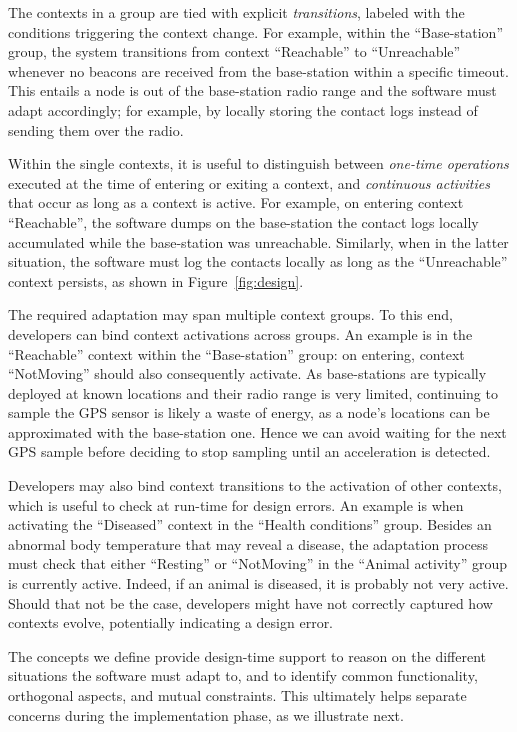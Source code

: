 The contexts in a group are tied with explicit \emph{transitions},
labeled with the conditions triggering the context change. For
example, within the ``Base-station'' group, the system transitions
from context ``Reachable'' to ``Unreachable'' whenever no beacons are
received from the base-station within a specific timeout. This entails
a node is out of the base-station radio range and the software must
adapt accordingly; for example, by locally storing the contact logs
instead of sending them over the radio.

Within the single contexts, it is useful to distinguish between
\emph{one-time operations} executed at the time of entering or exiting
a context, and \emph{continuous activities} that occur as long as a
context is active. For example, on entering context ``Reachable'', the
software dumps on the base-station the contact logs locally
accumulated while the base-station was unreachable. Similarly, when in
the latter situation, the software must log the contacts locally as
long as the ``Unreachable'' context persists, as shown in
Figure~\ref{fig:design}.

The required adaptation may span multiple context
groups. To this end, developers can bind context activations across
groups. An example is in the ``Reachable'' context within the
``Base-station'' group: on entering, context ``NotMoving'' should
also consequently activate. As base-stations are typically deployed at
known locations and their radio range is very limited, continuing
to sample the GPS sensor is likely a waste of energy, as a node's
locations can be approximated with the base-station one. Hence we can
avoid waiting for the next GPS sample before deciding to stop
sampling until an acceleration is detected.

Developers may also bind context transitions to the activation of
other contexts, which is useful to check at run-time for design
errors. An example is when activating the ``Diseased'' context in the
``Health conditions'' group. Besides an abnormal body temperature that
may reveal a disease, the adaptation process must check that either
``Resting'' or ``NotMoving'' in the ``Animal activity'' group is
currently active. Indeed, if an animal is diseased, it is probably not
very active. Should that not be the case, developers might have not
correctly captured how contexts evolve, potentially indicating a
design error.

The concepts we define provide design-time support to reason on the
different situations the software must adapt to, and to identify common
functionality, orthogonal aspects, and mutual constraints. This
ultimately helps separate concerns during the implementation phase, as
we illustrate next.



